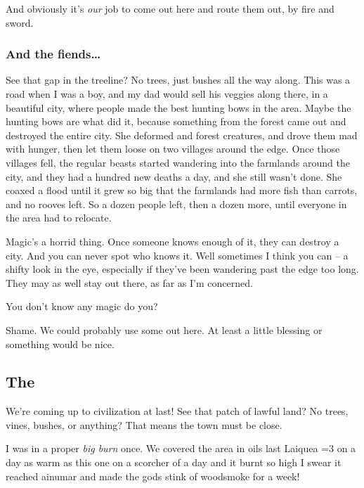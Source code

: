 \begin{multicols}{2}
\begin{exampletext}
  And obviously it's \emph{our} job to come out here and route them out, by fire and sword.


  \subsubsection*{And the fiends\ldots}

  See that gap in the treeline?
  No trees, just bushes all the way along.
  This was a road when I was a boy, and my dad would sell his veggies along there, in a beautiful city, where people made the best hunting bows in the area.
  Maybe the hunting bows are what did it, because something from the forest came out and destroyed the entire city.
  She deformed and forest creatures, and drove them mad with hunger, then let them loose on two \glspl{village} around the \gls{edge}.
  Once those \glspl{village} fell, the regular beasts started wandering into the farmlands around the city, and they had a hundred new deaths a day, and she still wasn't done.
  She coaxed a flood until it grew so big that the farmlands had more fish than carrots, and no rooves left.
  So a dozen people left, then a dozen more, until everyone in the area had to relocate.

  Magic's a horrid thing.
  Once someone knows enough of it, they can destroy a city.
  And you can never spot who knows it.
  Well sometimes I think you can -- a shifty look in the eye, especially if they've been wandering past the \gls{edge} too long.
  They may as well stay out there, as far as I'm concerned.

  You don't know any magic do you?

  Shame.
  We could probably use some out here.
  At least a little blessing or something would be nice.

\subsection*{The }

  We're coming up to civilization at last!
  See that patch of lawful land?
  No trees, vines, bushes, or anything?
  That means the town must be close.

  I was in a proper \textit{big burn} once.
  We covered the area in oils last \gls{Laiquea} \ifnum\value{temperature}=3 on a day as warm as this one \else on a scorcher of a day \fi and it burnt so high I swear it reached \gls{ainumar} and made the gods stink of woodsmoke for a week!


\end{exampletext}
\end{multicols}
